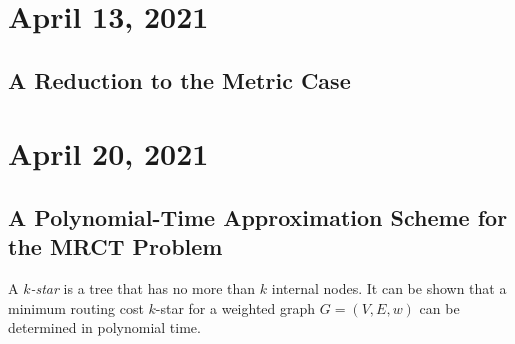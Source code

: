 \documentclass[11pt]{article}
\begin{document}
\section{April 13, 2021}
\subsection{A Reduction to the Metric Case}

\section{April 20, 2021}
\subsection{A Polynomial-Time Approximation Scheme for the MRCT Problem}
A \emph{$k$-star} is a tree that has no more than $k$ internal nodes.
It can be shown that a minimum routing cost $k$-star for a weighted graph $G = (V, E, w)$ can be determined in polynomial time.
\end{document}
